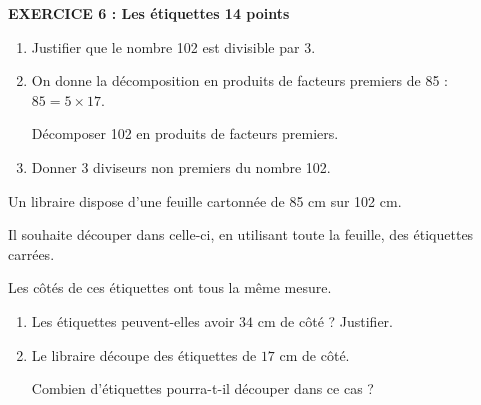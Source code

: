 \textbf{EXERCICE 6 : Les étiquettes \hfill 14 points}

\medskip
 
\begin{enumerate}
\item Justifier que le nombre 102 est divisible par 3.
\item On donne la décomposition en produits de facteurs premiers de 85 : $85 = 5 \times 17$.

Décomposer 102 en produits de facteurs premiers.
\item Donner 3 diviseurs non premiers du nombre 102.
\end{enumerate}

Un libraire dispose d'une feuille cartonnée de 85 cm sur 102 cm.

Il souhaite découper dans celle-ci, en utilisant toute la feuille, des étiquettes carrées. 

Les côtés de ces étiquettes ont tous la même mesure.
\begin{enumerate}[resume]
\item Les étiquettes peuvent-elles avoir $34$ cm de côté ? Justifier. 
\item Le libraire découpe des étiquettes de $17$ cm de côté.

Combien d'étiquettes pourra-t-il découper dans ce cas ?
\end{enumerate}

\vspace{0,5cm}

